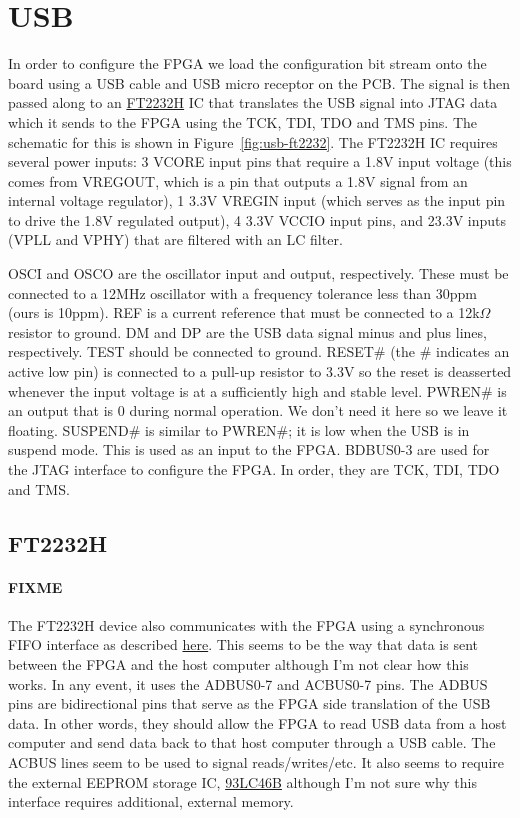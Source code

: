 \section{USB}

In order to configure the FPGA we load the configuration bit stream onto the board using a USB cable
and USB micro receptor on the PCB. The signal is then passed along to an
\href{http://www.ftdichip.com/Support/Documents/DataSheets/ICs/DS_FT2232H.pdf}{FT2232H} IC that
translates the USB signal into JTAG data which it sends to the FPGA using the TCK, TDI, TDO and TMS
pins. The schematic for this is shown in Figure~\ref{fig:usb-ft2232}. The FT2232H IC requires
several power inputs: 3 VCORE input pins that require a 1.8V input voltage (this comes from VREGOUT,
which is a pin that outputs a 1.8V signal from an internal voltage regulator), 1 3.3V VREGIN input
(which serves as the input pin to drive the 1.8V regulated output), 4 3.3V VCCIO input pins, and
23.3V inputs (VPLL and VPHY) that are filtered with an LC filter.

OSCI and OSCO are the oscillator input and output, respectively. These must be connected to a 12MHz
oscillator with a frequency tolerance less than 30ppm (ours is 10ppm). REF is a current reference
that must be connected to a 12k$\Omega$ resistor to ground. DM and DP are the USB data signal minus
and plus lines, respectively. TEST should be connected to ground. RESET\# (the \# indicates an
active low pin) is connected to a pull-up resistor to 3.3V so the reset is deasserted whenever the
input voltage is at a sufficiently high and stable level. PWREN\# is an output that is 0 during
normal operation. We don't need it here so we leave it floating. SUSPEND\# is similar to PWREN\#; it
is low when the USB is in suspend mode. This is used as an input to the FPGA. BDBUS0-3 are used for
the JTAG interface to configure the FPGA. In order, they are TCK, TDI, TDO and TMS.

\subsection{FT2232H}
\label{sec:ft2232h}

\paragraph{FIXME} The FT2232H device also communicates with the FPGA using a synchronous FIFO
interface as described
\href{http://www.ftdichip.com/Support/Documents/AppNotes/AN_130_FT2232H_Used_In_FT245\%20Synchronous\%20FIFO\%20Mode.pdf}{here}. This
seems to be the way that data is sent between the FPGA and the host computer although I'm not clear
how this works. In any event, it uses the ADBUS0-7 and ACBUS0-7 pins. The ADBUS pins are
bidirectional pins that serve as the FPGA side translation of the USB data. In other words, they
should allow the FPGA to read USB data from a host computer and send data back to that host computer
through a USB cable. The ACBUS lines seem to be used to signal reads/writes/etc. It also seems to
require the external EEPROM storage IC,
\href{http://ww1.microchip.com/downloads/en/DeviceDoc/20001749K.pdf}{93LC46B} although I'm not sure
why this interface requires additional, external memory.

